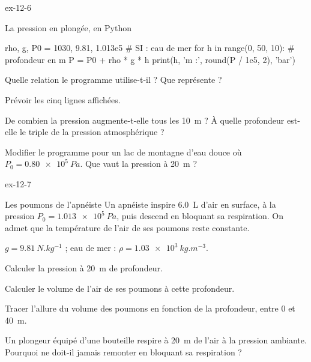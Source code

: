 \begin{blocLivre}{ex-12-6}
\begin{exercice}[2]{La pression en plongée, en Python}
\begin{python}
rho, g, P0 = 1030, 9.81, 1.013e5     # SI : eau de mer
for h in range(0, 50, 10):            # profondeur en m
    P = P0 + rho * g * h
    print(h, 'm :', round(P / 1e5, 2), 'bar')
\end{python}
\begin{questions}
\item {}Quelle relation le programme utilise-t-il ? Que représente  ?
\item Prévoir les cinq lignes affichées.
\item De combien la pression augmente-t-elle tous les \qty{10}{m} ? À quelle profondeur est-elle le triple de la pression atmosphérique ?
\item Modifier le programme pour un lac de montagne d'eau douce où $P_0=\qty{0,80e5}{Pa}$. Que vaut la pression à \qty{20}{m} ?
\end{questions}
\end{exercice}
\end{blocLivre}
\begin{blocLivre}{ex-12-7}
\begin{exercice}[2]{Les poumons de l'apnéiste}
Un apnéiste inspire \qty{6,0}{L} d'air en surface, à la pression $P_0=\qty{1,013e5}{Pa}$, puis descend en bloquant sa respiration. On
admet que la température de l'air de ses poumons reste constante.
\begin{donnees}
$g=\qty{9,81}{N.kg^{-1}}$ ; eau de mer : $\rho=\qty{1,03e3}{kg.m^{-3}}$.
\end{donnees}
\begin{questions}
\item Calculer la pression à \qty{20}{m} de profondeur.
\item Calculer le volume de l'air de ses poumons à cette profondeur.
\item Tracer l'allure du volume des poumons en fonction de la profondeur, entre 0 et \qty{40}{m}.
\item Un plongeur équipé d'une bouteille respire à \qty{20}{m} de l'air à la pression ambiante. Pourquoi ne doit-il jamais
remonter en bloquant sa respiration ?
\end{questions}
\end{exercice}
\end{blocLivre}
